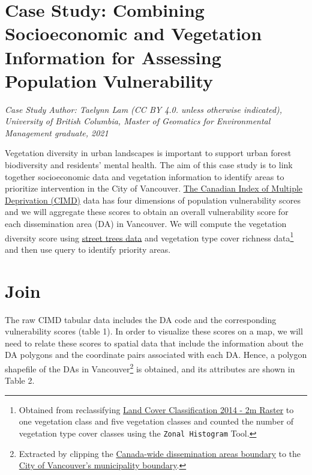 \documentclass[
]{book}
\begin{document}
\hypertarget{case-study-combining-socioeconomic-and-vegetation-information-for-assessing-population-vulnerability}{%
\section{Case Study: Combining Socioeconomic and Vegetation Information for Assessing Population Vulnerability}\label{case-study-combining-socioeconomic-and-vegetation-information-for-assessing-population-vulnerability}}

\emph{Case Study Author: Taelynn Lam (CC BY 4.0. unless otherwise indicated), University of British Columbia, Master of Geomatics for Environmental Management graduate, 2021}

Vegetation diversity in urban landscapes is important to support urban forest biodiversity and residents' mental health. The aim of this case study is to link together socioeconomic data and vegetation information to identify areas to prioritize intervention in the City of Vancouver. \href{https://www150.statcan.gc.ca/n1/pub/45-20-0001/452000012019001-eng.htm}{The Canadian Index of Multiple Deprivation (CIMD)} data has four dimensions of population vulnerability scores and we will aggregate these scores to obtain an overall vulnerability score for each dissemination area (DA) in Vancouver. We will compute the vegetation diversity score using \href{https://opendata.vancouver.ca/explore/dataset/street-trees/}{street trees data} and vegetation type cover richness data\footnote{Obtained from reclassifying \href{http://www.metrovancouver.org/data}{Land Cover Classification 2014 - 2m Raster} to one vegetation class and five vegetation classes and counted the number of vegetation type cover classes using the \texttt{Zonal\ Histogram} Tool.} and then use query to identify priority areas.

\hypertarget{join}{%
\section{Join}\label{join}}

The raw CIMD tabular data includes the DA code and the corresponding vulnerability scores (table 1). In order to visualize these scores on a map, we will need to relate these scores to spatial data that include the information about the DA polygons and the coordinate pairs associated with each DA. Hence, a polygon shapefile of the DAs in Vancouver\footnote{Extracted by clipping the \href{https://www12.statcan.gc.ca/census-recensement/2011/geo/bound-limit/bound-limit-2016-eng.cfm}{Canada-wide dissemination areas boundary} to the \href{https://opendata.vancouver.ca/explore/dataset/city-boundary}{City of Vancouver's municipality boundary}.} is obtained, and its attributes are shown in Table 2.
\end{document}
